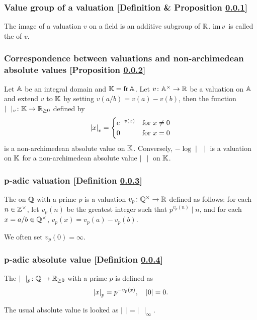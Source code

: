 \subsubsection{Value group of a valuation [Definition \& Proposition \ref{value-group-of-a-valuation}]}\label{value-group-of-a-valuation}
The image of a valuation $v$ on a field is an additive subgroup of $\mathbb{R}$. $\operatorname{im} v$ is called the  of $v$.

\subsubsection{Correspondence between valuations and non-archimedean absolute values [Proposition \ref{correspondence-between-valuations-and-non-archimedean-absolute-values}]}\label{correspondence-between-valuations-and-non-archimedean-absolute-values}
Let $\mathbb{A}$ be an integral domain and $\mathbb{K} = \mathrm{fr} \,\mathbb{A}$. Let $v\colon \mathbb{A}^\times \to \mathbb{R}$ be a valuation on $\mathbb{A}$ and extend $v$ to $\mathbb{K}$ by setting $v(a/b) = v(a) - v(b)$, then the function $\mid\ \ \mid_v \colon \mathbb{K} \to \mathbb{R}_{\ge 0}$ defined by
\[
\left| x \right|_v = \begin{cases}
 e^{-v(x)} & \text{for}\ x \neq 0 \\
 0 & \text{for}\ x = 0
 \end{cases}
 \] is a non-archimedean absolute value on $\mathbb{K}$. Conversely, $-\log \mid \,\ \mid$ is a valuation on $\mathbb{K}$ for a non-archimedean absolute value $\mid\ \ \mid$ on $\mathbb{K}$.


\subsubsection{p-adic valuation [Definition \ref{p-adic-valuation}]}\label{p-adic-valuation}
The  on $\mathbb{Q}$ with a prime $p$ is a valuation $v_p \colon \mathbb{Q}^\times \to \mathbb{R}$ defined as follows: for each $n \in \mathbb{Z}^\times$, let $v_p(n)$ be the greatest integer such that $p^{v_p(n)} \mid n$, and for each $x = a / b \in \mathbb{Q}^\times$, $v_p(x) = v_p(a) - v_p(b)$.

We often set $v_p(0) = \infty$.

\subsubsection{p-adic absolute value [Definition \ref{p-adic-absolute-value}]}\label{p-adic-absolute-value}
The  $\mid\ \ \mid_p \colon \mathbb{Q} \to \mathbb{R}_{\ge0}$ with a prime $p$ is defined as
\[
\left| x \right|_p = p^{-v_p(x)},\quad |0| = 0.
\]

The usual absolute value is looked as $\mid\ \ \mid = \mid\ \ \mid_\infty$.
